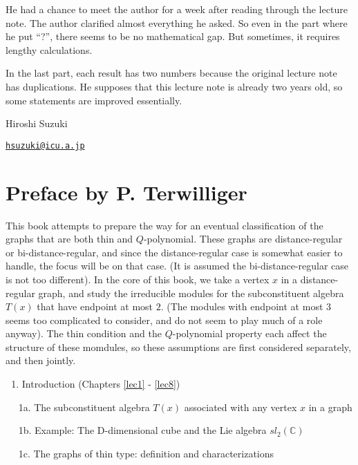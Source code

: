 \documentclass[
]{book}
\providecommand{\tightlist}{%
  \setlength{\itemsep}{0pt}\setlength{\parskip}{0pt}}
\theoremstyle{definition}
\theoremstyle{definition}
\theoremstyle{definition}
\theoremstyle{definition}
\theoremstyle{remark}
\begin{document}
He had a chance to meet the author for a week after reading through the lecture note. The author clarified almost everything he asked. So even in the part where he put ``?'', there seems to be no mathematical gap. But sometimes, it requires lengthy calculations.

In the last part, each result has two numbers because the original lecture note has duplications. He supposes that this lecture note is already two years old, so some statements are improved essentially.

Hiroshi Suzuki

\href{mailto:hsuzuki@icu.a.jp}{\nolinkurl{hsuzuki@icu.a.jp}}

\hypertarget{preface-by-p.-terwilliger}{%
\section*{Preface by P. Terwilliger}\label{preface-by-p.-terwilliger}}

This book attempts to prepare the way for an eventual classification of the graphs that are both thin and \(Q\)-polynomial. These graphs are distance-regular or bi-distance-regular, and since the distance-regular case is somewhat easier to handle, the focus will be on that case. (It is assumed the bi-distance-regular case is not too different). In the core of this book, we take a vertex \(x\) in a distance-regular graph, and study the irreducible modules for the subconstituent algebra \(T(x)\) that have endpoint at most \(2\). (The modules with endpoint at most \(3\) seems too complicated to consider, and do not seem to play much of a role anyway). The thin condition and the \(Q\)-polynomial property each affect the structure of these momdules, so these assumptions are first considered separately, and then jointly.

\begin{enumerate}
\def\labelenumi{\arabic{enumi}.}
\tightlist
\item
  Introduction (Chapters \ref{lec1} - \ref{lec8})
\end{enumerate}

\(\quad\) 1a. The subconstituent algebra \(T(x)\) associated with any vertex \(x\) in a graph

\(\quad\) 1b. Example: The D-dimensional cube and the Lie algebra \(sl_2(\mathbb{C})\)

\(\quad\) 1c. The graphs of thin type: definition and characterizations
\end{document}

